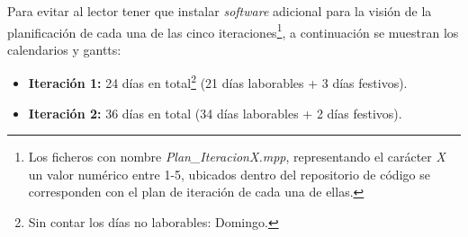 \documentclass[12pt,a4paper, twoside]{report}
\begin{document}
	Para evitar al lector tener que instalar \textit{software} adicional para la visión de la planificación de cada una de las cinco iteraciones\footnote{Los ficheros con nombre \textit{Plan\_IteracionX.mpp}, representando el carácter \textit{X} un valor numérico entre 1-5, ubicados dentro del repositorio de código se corresponden con el plan de iteración de cada una de ellas.}, a continuación se muestran los calendarios y \glspl{gantt}: 
	
	\begin{itemize}

		\item \textbf{Iteración 1:} 24 días en total\footnote{Sin contar los días no laborables: Domingo.} (21 días laborables + 3 días festivos).
		
%		
		
		\newpage
		\item \textbf{Iteración 2:} 36 días en total (34 días laborables + 2 días festivos).
		
%		
		

\end{itemize}
\end{document}
